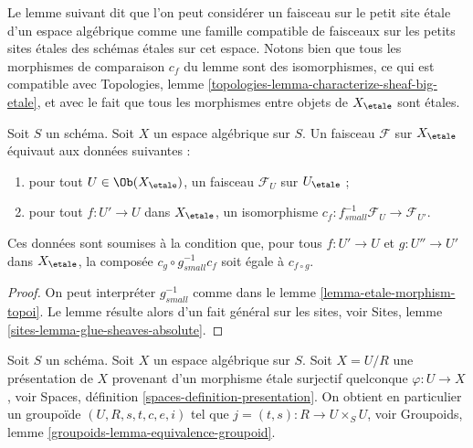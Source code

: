 \noindent
Le lemme suivant dit que l'on peut considérer un faisceau sur le petit
site \'etale d'un espace algébrique comme une famille compatible de faisceaux
sur les petits sites \'etales des schémas \'etales sur cet espace. Notons bien
que tous les morphismes de comparaison $c_f$ du lemme sont des isomorphismes,
ce qui est compatible avec
Topologies, lemme \ref{topologies-lemma-characterize-sheaf-big-etale},
et avec le fait que tous les morphismes entre objets de $X_\etale$
sont \'etales.

\begin{lemma}
\label{lemma-characterize-sheaf-small-etale}
Soit $S$ un schéma. Soit $X$ un espace algébrique sur $S$.
Un faisceau $\mathcal{F}$ sur $X_\etale$ équivaut aux données suivantes :
\begin{enumerate}
\item pour tout $U \in \Ob(X_\etale)$, un faisceau
$\mathcal{F}_U$ sur $U_\etale$ ;
\item pour tout $f : U' \to U$ dans $X_\etale$, un isomorphisme
$c_f : f_{small}^{-1}\mathcal{F}_U \to \mathcal{F}_{U'}$.
\end{enumerate}
Ces données sont soumises à la condition que, pour tous $f : U' \to U$
et $g : U'' \to U'$ dans $X_\etale$, la composée
$c_g \circ g_{small}^{-1} c_f$ soit égale à $c_{f \circ g}$.
\end{lemma}

\begin{proof}
On peut interpréter $g_{small}^{-1}$ comme dans le lemme \ref{lemma-etale-morphism-topoi}.
Le lemme résulte alors d'un fait général sur les sites, voir
Sites, lemme \ref{sites-lemma-glue-sheaves-absolute}.
\end{proof}

\noindent
Soit $S$ un schéma. Soit $X$ un espace algébrique sur $S$.
Soit $X = U/R$ une présentation de $X$ provenant d'un morphisme
\'etale surjectif quelconque $\varphi : U \to X$, voir
Spaces, définition \ref{spaces-definition-presentation}.
On obtient en particulier un groupoïde $(U, R, s, t, c, e, i)$ tel que
$j = (t, s) : R \to U \times_S U$, voir
Groupoids, lemme \ref{groupoids-lemma-equivalence-groupoid}.

